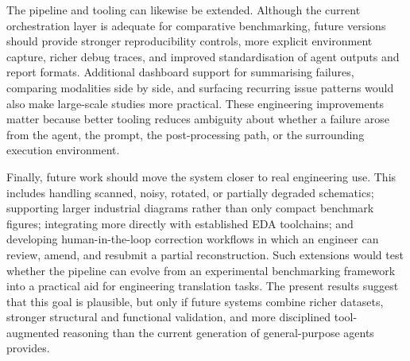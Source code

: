 The pipeline and tooling can likewise be extended. Although the current orchestration layer is adequate for comparative benchmarking, future versions should provide stronger reproducibility controls, more explicit environment capture, richer debug traces, and improved standardisation of agent outputs and report formats. Additional dashboard support for summarising failures, comparing modalities side by side, and surfacing recurring issue patterns would also make large-scale studies more practical. These engineering improvements matter because better tooling reduces ambiguity about whether a failure arose from the agent, the prompt, the post-processing path, or the surrounding execution environment.

Finally, future work should move the system closer to real engineering use. This includes handling scanned, noisy, rotated, or partially degraded schematics; supporting larger industrial diagrams rather than only compact benchmark figures; integrating more directly with established EDA toolchains; and developing human-in-the-loop correction workflows in which an engineer can review, amend, and resubmit a partial reconstruction. Such extensions would test whether the pipeline can evolve from an experimental benchmarking framework into a practical aid for engineering translation tasks. The present results suggest that this goal is plausible, but only if future systems combine richer datasets, stronger structural and functional validation, and more disciplined tool-augmented reasoning than the current generation of general-purpose agents provides.
